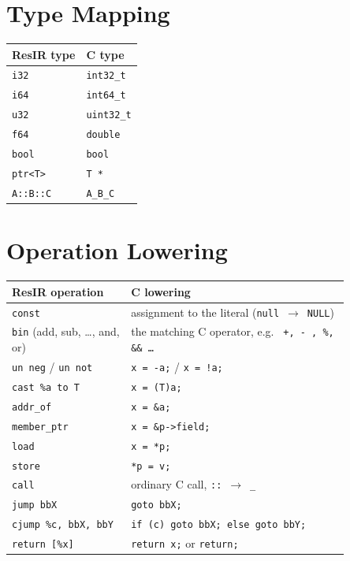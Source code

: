 \documentclass[11pt,a4paper,oneside]{report}
\begin{document}
	\section{Type Mapping}
	\begin{center}
		\begin{tabular}{ll}
			\toprule
			ResIR type & C type \\
			\midrule
			\texttt{i32} & \texttt{int32\_t} \\
			\texttt{i64} & \texttt{int64\_t} \\
			\texttt{u32} & \texttt{uint32\_t} \\
			\texttt{f64} & \texttt{double} \\
			\texttt{bool} & \texttt{bool} \\
			\texttt{ptr<T>} & \texttt{T *} \\
			\texttt{A::B::C} & \texttt{A\_B\_C} \\
		\end{tabular}
	\end{center}
	
\section{Operation Lowering}
\begin{longtable}{p{0.30\linewidth}p{0.55\linewidth}}
	\toprule
	ResIR operation & C lowering \\
	\midrule

	\texttt{const}               & assignment to the literal (\texttt{null}~$\rightarrow$~\texttt{NULL}) \\

	\texttt{bin} (add, sub, \dots, and, or) & the matching C operator, e.g. \texttt{ +, - , \%, \&\& \dots} \\

	\texttt{un neg} / \texttt{un not} & \texttt{x = -a;} / \texttt{x = !a;} \\

	\texttt{cast \%a to T}        & \texttt{x = (T)a;} \\

	\texttt{addr\_of}            & \texttt{x = \&a;} \\

	\texttt{member\_ptr}         & \texttt{x = \&p->field;} \\

	\texttt{load}                & \texttt{x = *p;} \\

	\texttt{store}               & \texttt{*p = v;} \\

	\texttt{call}                & ordinary C call, \texttt{::}~$\rightarrow$~\texttt{\_} \\

	\texttt{jump bbX}            & \texttt{goto bbX;} \\

	\texttt{cjump \%c, bbX, bbY} & \texttt{if (c) goto bbX; else goto bbY;} \\

	\texttt{return [\%x]}        & \texttt{return x;} or \texttt{return;} \\
\end{longtable}
	
\end{document}
